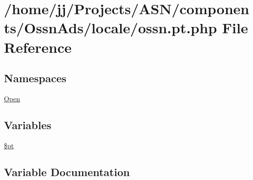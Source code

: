 \hypertarget{components_2_ossn_ads_2locale_2ossn_8pt_8php}{}\section{/home/jj/\+Projects/\+A\+S\+N/components/\+Ossn\+Ads/locale/ossn.pt.\+php File Reference}
\label{components_2_ossn_ads_2locale_2ossn_8pt_8php}
\subsection*{Namespaces}
\begin{DoxyCompactItemize}
\item 
 \hyperlink{namespace_open}{Open}
\end{DoxyCompactItemize}
\subsection*{Variables}
\begin{DoxyCompactItemize}
\item 
\hyperlink{components_2_ossn_ads_2locale_2ossn_8pt_8php_a62c150775a7a00e8663463c638016cad}{\$pt}
\end{DoxyCompactItemize}


\subsection{Variable Documentation}
